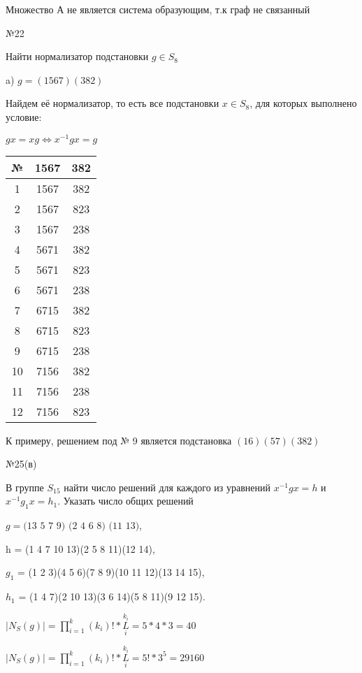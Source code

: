 \documentclass[14pt, letterpaper, twoside]{article}
\begin{document}
Множество А не является система образующим, т.к граф не связанный


\noindent№22

Найти нормализатор подстановки $g   \in S_8$

a) $g=(1567)(382)$

Найдем её нормализатор, то есть все подстановки $x \in S_8$, для которых выполнено условие:

$gx=xg  \Leftrightarrow x^{-1}gx=g$

\begin{tabular}{ || c | c | c || }
    \hline
    № & 1567 & 382  \\ \hline
    1 & 1567 & 382 \\ \hline
    2 & 1567 & 823 \\ \hline
    3 & 1567 &  238\\ \hline
    4 & 5671 &  382\\ \hline
    5 & 5671 &  823\\ \hline
    6 & 5671 &  238\\ \hline
    7 & 6715 &  382\\ \hline
    8 & 6715 &  823\\ \hline
    9 & 6715 &  238\\ \hline
    10 & 7156 &  382\\ \hline
    11 & 7156 &  238\\ \hline
    12 & 7156 &  823\\ \hline
    
    
\end{tabular}


         К примеру, решением под № 9 является подстановка $(16)(57)(382)$


\noindent№25(в)

В группе $S_15$ найти число решений для каждого из уравнений $x^{-1}gx=h$ и $x^{-1}g_1x=h_1$. Указать число общих решений 

$g=(13$ $5$ $7$ $9)$ $(2$ $4$ $6$ $8)$ $(11$ $13)$,

h = (1 4 7 10 13)(2 5 8 11)(12 14),

$g_1$ = (1 2 3)(4 5 6)(7 8 9)(10 11 12)(13 14 15),

$h_1$ = (1 4 7)(2 10 13)(3 6 14)(5 8 11)(9 12 15).

$|N_S(g)|=\prod\limits_{i=1}^{k}(k_i)!*L\limits_i^{k_i}=5*4*3=40$
\par
$|N_S(g)|=\prod\limits_{i=1}^{k}(k_i)!*L\limits_i^{k_i}=5!*3^5 =29160$
\end{document}
